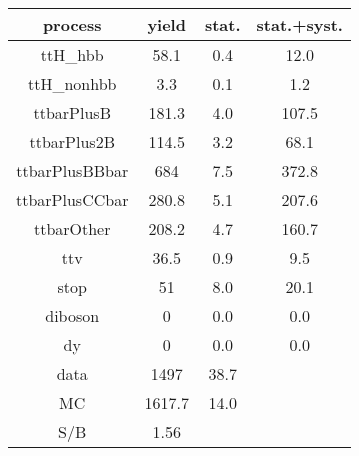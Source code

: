 \begin{tabular}{cccc}
\hline
    process     &  yield  &  stat.  &  stat.+syst.  \\
\hline
    ttH\_hbb     &  58.1   &   0.4   &     12.0      \\
   ttH\_nonhbb   &   3.3   &   0.1   &      1.2      \\
   ttbarPlusB   &  181.3  &   4.0   &     107.5     \\
  ttbarPlus2B   &  114.5  &   3.2   &     68.1      \\
 ttbarPlusBBbar &   684   &   7.5   &     372.8     \\
 ttbarPlusCCbar &  280.8  &   5.1   &     207.6     \\
   ttbarOther   &  208.2  &   4.7   &     160.7     \\
      ttv       &  36.5   &   0.9   &      9.5      \\
      stop      &   51    &   8.0   &     20.1      \\
    diboson     &    0    &   0.0   &      0.0      \\
       dy       &    0    &   0.0   &      0.0      \\
      data      &  1497   &  38.7   &               \\
       MC       & 1617.7  &  14.0   &               \\
      S/B       &  1.56   &         &               \\
\hline
\end{tabular}